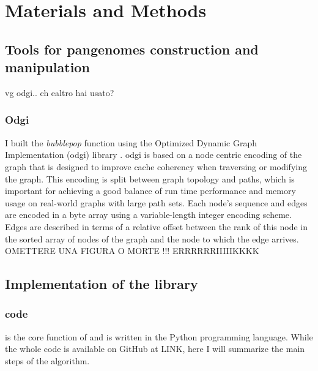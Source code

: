 
\chapter{Materials and Methods}  %

\label{Chapter7} %


\section{Tools for pangenomes construction and manipulation }

vg odgi.. ch ealtro hai usato? 

\subsection{Odgi}

I built the \textit{bubblepop} function using the Optimized Dynamic Graph Implementation (odgi) library \cite{eizenga2020succinct}. odgi is based on a node centric encoding of the graph that is designed to improve cache coherency when traversing or modifying the graph. This encoding is split between graph topology and paths, which is important for achieving a good balance of run time performance and memory usage on real-world graphs with large path sets. Each node’s sequence and edges are encoded in a byte array using a variable-length integer encoding scheme. Edges are described in terms of a relative offset between the rank of this node in the sorted array of nodes of the graph and the node to which the edge arrives. OMETTERE UNA FIGURA O MORTE !!! ERRRRRRIIIIIKKKK 


\section{Implementation of the \vgp library}
\subsection{\bbp code}

\bbp is the core function of \vgp and is written in the Python programming language. While the whole code is available on GitHub at LINK, here I will summarize the main steps of the algorithm. \\

